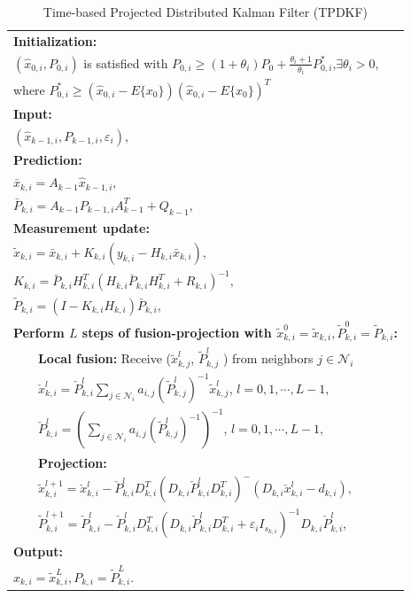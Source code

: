\documentclass[journal,transmag]{IEEEtran}
\begin{document}
	\begin{table}[htbp]
		\caption{Time-based Projected Distributed Kalman Filter (TPDKF)}
		\label{ODKF2}	
		\centering  %
		\begin{tabular}{l}  %
			\hline\hline
			\textbf{Initialization:}\\
			{
			$(\hat x_{0,i},P_{0,i})$ is satisfied with $P_{0,i}\geq (1+\theta_i)P_0+\frac{\theta_i+1}{\theta_i}P_{0,i}^*$,$\exists \theta_i>0, $}\\
			{where $P_{0,i}^*\geq (\hat x_{0,i}-E\{x_0\})(\hat x_{0,i}-E\{x_0\})^T$}\\
			\textbf{Input:}\\	
			$(\hat x_{k-1,i},P_{k-1,i},\varepsilon_i)$,  \\
			\textbf{Prediction:}\\
			$\bar x_{k,i}=A_{k-1}\hat x_{k-1,i},$\\  %
			$\bar P_{k,i}=A_{k-1}P_{k-1,i}A_{k-1}^T+Q_{k-1},$\\         %
			\textbf{Measurement update:}\\
			$\tilde x_{k,i}=\bar x_{k,i}+K_{k,i}(y_{k,i}-H_{k,i}\bar x_{k,i}),$\\        %
			$K_{k,i}=\bar P_{k,i}H_{k,i}^T(H_{k,i}\bar P_{k,i}H_{k,i}^T+R_{k,i})^{-1},$\\
			$\tilde P_{k,i}=(I-K_{k,i}H_{k,i})\bar P_{k,i}$,\\
			{\textbf{Perform $L$ steps of fusion-projection with $\tilde x_{k,i}^0=\tilde x_{k,i},\tilde P_{k,i}^0=\tilde P_{k,i}$:}}\\
			{$\qquad$\textbf{Local fusion:} Receive ($\tilde x_{k,j}^l$, $\tilde P_{k,j}^l$ ) from neighbors $j\in \mathcal{N}_{i}$}\\
			{$\qquad$$\check x_{k,i}^l=\check P_{k,i}^l\sum_{j\in \mathcal{N}_{i}}a_{i,j}(\tilde P_{k,j}^l)^{-1}\tilde x_{k,j}^l$, $l=0,1,\cdots,L-1,$}\\	
			{$\qquad$$\check P_{k,i}^l=(\sum_{j\in \mathcal{N}_{i}}a_{i,j}(\tilde P_{k,j}^l)^{-1})^{-1}$, $l=0,1,\cdots,L-1,$}	\\	
			{$\qquad$\textbf{Projection:}}\\
			{$\qquad$$\tilde x_{k,i}^{l+1}=\check x_{k,i}^l-\check P_{k,i}^lD_{k,i}^T(D_{k,i}\check P_{k,i}^lD_{k,i}^T)^{-}(D_{k,i}\check x_{k,i}^l-d_{k,i}),$}\\
			{$\qquad$$\tilde P_{k,i}^{l+1}=\check P_{k,i}^l-\check P_{k,i}^lD_{k,i}^T(D_{k,i}\check P_{k,i}^lD_{k,i}^T+\varepsilon_i I_{s_{k,i}})^{-1}D_{k,i}\check P_{k,i}^l$,}\\
			\textbf{Output:}\\	
			{$\hat x_{k,i}=\tilde x_{k,i}^L,P_{k,i}=\tilde P_{k,i}^L$.}	\\
			\hline
		\end{tabular}
	\end{table}
\end{document}
